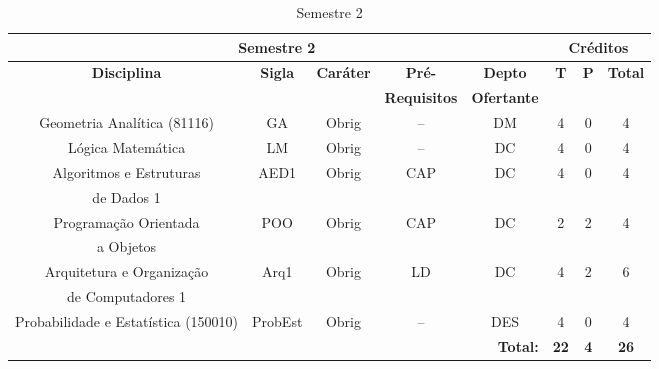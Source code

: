 \begin{table}[H]
\caption{Semestre 2}
\centering
\footnotesize
\begin{tabular}{|c|c|c|c|c|c|c|c|} %
\hline
\hline
\multicolumn{5}{|c|}{\textbf{Semestre 2}}  &  \multicolumn{3}{|c|}{\textbf{Créditos}} \\
\hline
\hline
\textbf{Disciplina} & \textbf{Sigla} & \textbf{Caráter} & \textbf{Pré-} & \textbf{Depto} &  \textbf{T}  &  \textbf{P}  & \textbf{Total} \\ 
& & & \textbf{Requisitos}  & \textbf{Ofertante} & & & \\
\hline 
Geometria Analítica (81116) & GA & Obrig & -- & DM & 4 & 0 & 4 \\
\hline
Lógica Matemática & LM & Obrig & -- & DC & 4 & 0 & 4 \\
\hline
Algoritmos e Estruturas & AED1 & Obrig & CAP & DC  & 4 & 0 & 4 \\
de Dados 1 & & & & & & & \\
\hline
Programação Orientada & POO & Obrig & CAP & DC  & 2 & 2 & 4 \\
a Objetos & & & & & & & \\
\hline
Arquitetura e Organização & Arq1 & Obrig & LD & DC & 4 & 2 & 6 \\
de Computadores 1 & & & & & & & \\
\hline
Probabilidade e Estatística (150010) & ProbEst & Obrig & -- & DES & 4 & 0 & 4 \\
\hline
\hline
\multicolumn{5}{|r|}{\textbf{Total:}}  &  \textbf{22}  &  \textbf{4}   & \textbf{26} \\ %
\hline
\hline
\end{tabular}
\label{tab:matriz2}
\end{table}



